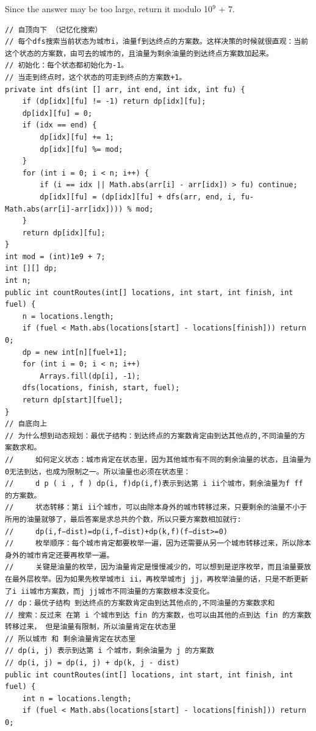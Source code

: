 \documentclass[9pt, b5paaper]{book}
\begin{document}
Since the answer may be too large, return it modulo 10$^{\text{9}}$ + 7.
\begin{verbatim}
// 自顶向下 （记忆化搜索）
// 每个dfs搜索当前状态为城市i，油量f到达终点的方案数。这样决策的时候就很直观：当前这个状态的方案数，由可去的城市的，且油量为剩余油量的到达终点方案数加起来。
// 初始化：每个状态都初始化为-1。
// 当走到终点时，这个状态的可走到终点的方案数+1。
private int dfs(int [] arr, int end, int idx, int fu) {
    if (dp[idx][fu] != -1) return dp[idx][fu];
    dp[idx][fu] = 0;
    if (idx == end) {
        dp[idx][fu] += 1;
        dp[idx][fu] %= mod;
    }
    for (int i = 0; i < n; i++) {
        if (i == idx || Math.abs(arr[i] - arr[idx]) > fu) continue;
        dp[idx][fu] = (dp[idx][fu] + dfs(arr, end, i, fu-Math.abs(arr[i]-arr[idx]))) % mod;
    }
    return dp[idx][fu];
}
int mod = (int)1e9 + 7;
int [][] dp;
int n;
public int countRoutes(int[] locations, int start, int finish, int fuel) {
    n = locations.length;
    if (fuel < Math.abs(locations[start] - locations[finish])) return 0;
    dp = new int[n][fuel+1];
    for (int i = 0; i < n; i++) 
        Arrays.fill(dp[i], -1);
    dfs(locations, finish, start, fuel);
    return dp[start][fuel];
}
// 自底向上
// 为什么想到动态规划：最优子结构：到达终点的方案数肯定由到达其他点的,不同油量的方案数求和。
//     如何定义状态：城市肯定在状态里，因为其他城市有不同的剩余油量的状态，且油量为0无法到达，也成为限制之一。所以油量也必须在状态里：
//     d p ( i , f ) dp(i, f)dp(i,f)表示到达第 i ii个城市，剩余油量为f ff 的方案数。
//     状态转移：第i ii个城市，可以由除本身外的城市转移过来，只要剩余的油量不小于所用的油量就够了，最后答案是求总共的个数，所以只要方案数相加就行:
//     dp(i,f−dist)=dp(i,f−dist)+dp(k,f)(f−dist>=0)
//     枚举顺序：每个城市肯定都要枚举一遍，因为还需要从另一个城市转移过来，所以除本身外的城市肯定还要再枚举一遍。
//     关键是油量的枚举，因为油量肯定是慢慢减少的，可以想到是逆序枚举，而且油量要放在最外层枚举。因为如果先枚举城市i ii，再枚举城市j jj，再枚举油量的话，只是不断更新了i ii城市方案数，而j jj城市不同油量的方案数根本没变化。
// dp：最优子结构 到达终点的方案数肯定由到达其他点的,不同油量的方案数求和
// 搜索：反过来 在第 i 个城市到达 fin 的方案数，也可以由其他的点到达 fin 的方案数转移过来， 但是油量有限制，所以油量肯定在状态里
// 所以城市 和 剩余油量肯定在状态里
// dp(i, j) 表示到达第 i 个城市，剩余油量为 j 的方案数
// dp(i, j) = dp(i, j) + dp(k, j - dist)
public int countRoutes(int[] locations, int start, int finish, int fuel) {
    int n = locations.length;
    if (fuel < Math.abs(locations[start] - locations[finish])) return 0;

\end{verbatim}
\end{document}
